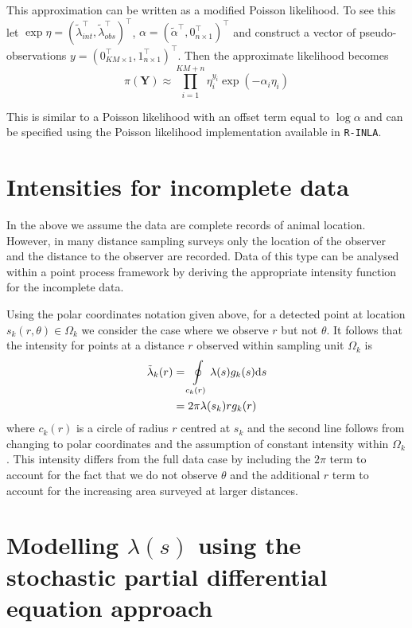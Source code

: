 \documentclass[preprint,12pt]{elsarticle}
\newcommand{\bm}{\boldsymbol}  %
\newcommand{\tl}{\tilde{\lambda}}   %
\begin{document}
This approximation can be written as a modified Poisson likelihood.  To see this let $\exp \eta = (\tl_{int}^\intercal, \tl_{obs}^\intercal)^\intercal$,
$\alpha = (\tilde{\alpha}^\intercal, 0_{n \times 1}^\intercal)^\intercal$ and construct a vector of pseudo-observations $y = (0_{KM\times 1}^\intercal, 1_{n \times 1}^\intercal)^\intercal$.  Then the approximate likelihood becomes
\begin{equation}
\pi(\bm{Y}) \approx \prod_{i=1}^{KM + n} \eta_i^{y_i}\exp(-\alpha_i\eta_i)
\end{equation}

This is similar to a Poisson likelihood with an offset term equal to $\log\alpha$ and can be specified using the Poisson likelihood implementation available in \texttt{R-INLA}.


\section*{Intensities for incomplete data}

In the above we assume the data are complete records of animal location.  However, in many distance sampling surveys only the location of the observer and the distance to the observer are recorded.  Data of this type can be analysed within a point process framework by deriving the appropriate intensity function for the incomplete data.

Using the polar coordinates notation given above, for a detected point at location $s_k(r, \theta) \in \Omega_k$ we consider the case where we observe $r$ but not $\theta$.  It follows that the intensity for points at a distance $r$ observed within sampling unit $\Omega_k$ is
\begin{align}
\label{intensity-incomplete}
\tl_k(r) &= \oint\displaylimits_{c_k(r)} \lambda(s)g_k(s)\mathrm{d}s \nonumber \\
&= 2\pi\lambda(s_k)rg_k(r)
\end{align}
 where $c_k(r)$ is a circle of radius $r$ centred at $s_k$ and the second line follows from changing to polar coordinates and the assumption of constant intensity within $\Omega_k$.  This intensity differs from the full data case by including the $2\pi$  term to account for the fact that we do not observe $\theta$ and the additional $r$ term to account for the increasing area surveyed at larger distances.

\section*{Modelling $\lambda(s)$ using the stochastic partial differential equation approach}
\end{document}
